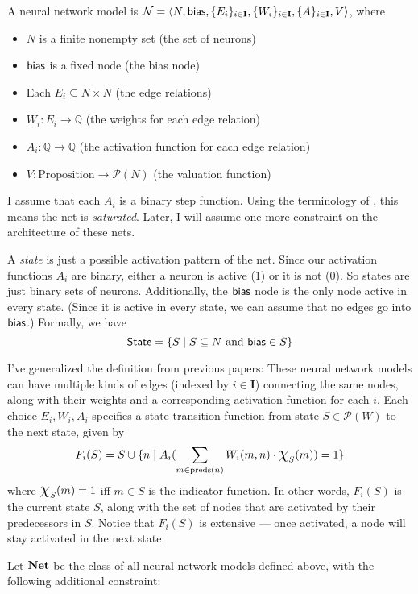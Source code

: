 \documentclass[letterpaper]{article}
\begin{document}
A neural network model is $\mathcal{N} = \langle N, \mathsf{bias}, \{ E_i \}_{i \in \textbf{I}}, \{ W_i \}_{i \in \textbf{I}}, \{ A \}_{i \in \textbf{I}}, V \rangle$, where
\begin{itemize}
    \item $N$ is a finite nonempty set (the set of neurons)
    \item $\mathsf{bias}$ is a fixed node (the bias node)
    \item Each $E_i \subseteq N \times N$ (the edge relations)
    \item $W_i : E_i \to \mathbb{Q}$ (the weights for each edge relation)
    \item $A_i : \mathbb{Q} \to \mathbb{Q}$ (the activation function for each edge relation)
    \item $V : \textrm{Proposition} \to \mathcal{P}(N)$ (the valuation function)
\end{itemize}
I assume that each $A_i$ is a binary step function. Using the terminology of \cite{merrill2020formal}, this means the net is \emph{saturated}.  Later, I will assume one more constraint on the architecture of these nets.

A \emph{state} is just a possible activation pattern of the net. Since our activation functions $A_i$ are binary, either a neuron is active (1) or it is not (0).  So states are just binary sets of neurons. Additionally, the $\mathsf{bias}$ node is the only node active in every state. (Since it is active in every state, we can assume that no edges go into $\mathsf{bias}$.) Formally, we have
\[
    \mathsf{State} = \{ S \mid S \subseteq N \mbox{ and } \mathsf{bias} \in S \}
\]

I've generalized the definition from previous papers: These neural network models can have multiple kinds of edges (indexed by $i \in \textbf{I}$) connecting the same nodes, along with their weights and a corresponding activation function for each $i$.  Each choice $E_i, W_i, A_i$ specifies a state transition function from state $S \in \mathcal{P}(W)$ to the next state, given by
\[
    F_i(S) = S \cup \{ n \mid A_i(\sum_{m \in \mathrm{preds}(n)} W_i(m, n) \cdot \mbox{\Large$\chi$}_S(m)) = 1 \}
\]
where $\mbox{\Large$\chi$}_S(m) = 1$ iff $m \in S$ is the indicator function.  In other words, $F_i(S)$ is the current state $S$, along with the set of nodes that are activated by their predecessors in $S$.  Notice that $F_i(S)$ is extensive --- once activated, a node will stay activated in the next state.

Let $\textrm{\textbf{Net}}$ be the class of all neural network models defined above, with the following additional constraint: 
\end{document}
